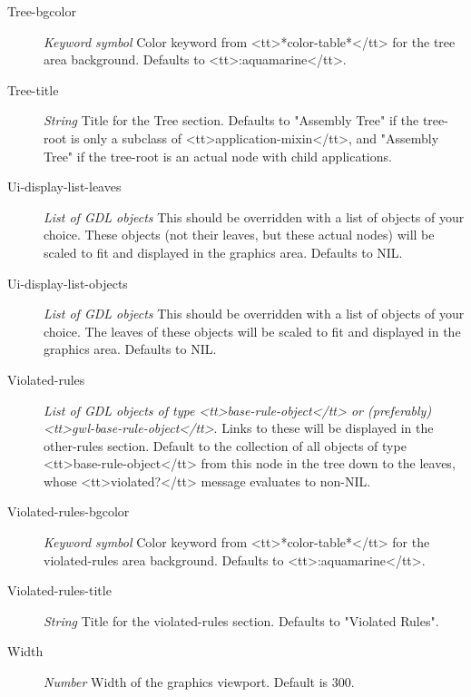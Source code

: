 \documentclass [11pt]{book}
\begin{document}
\begin{itemize}
\begin{description}
\item [Tree-bgcolor]
\emph{Keyword symbol} Color keyword from <tt>*color-table*</tt> for the tree area background. Defaults to <tt>:aquamarine</tt>.


\item [Tree-title]
\emph{String} Title for the Tree section. Defaults to "Assembly Tree" if the tree-root is only a
subclass of <tt>application-mixin</tt>, and "Assembly Tree" if the tree-root is an actual node with
child applications.


\item [Ui-display-list-leaves]
\emph{List of GDL objects} This should be overridden with a list of objects of your choice. These objects (not their leaves,
but these actual nodes) will be scaled to fit and displayed in the graphics area. Defaults to NIL.


\item [Ui-display-list-objects]
\emph{List of GDL objects} This should be overridden with a list of objects of your choice. The leaves of these objects will
be scaled to fit and displayed in the graphics area. Defaults to NIL.


\item [Violated-rules]
\emph{List of GDL objects of type <tt>base-rule-object</tt> or (preferably) <tt>gwl-base-rule-object</tt>}.
Links to these will be displayed in the other-rules section. Default to the collection of all objects of type
<tt>base-rule-object</tt> from this node in the tree down to the leaves, whose <tt>violated?</tt> message
evaluates to non-NIL.


\item [Violated-rules-bgcolor]
\emph{Keyword symbol} Color keyword from <tt>*color-table*</tt> for the violated-rules area background. Defaults to <tt>:aquamarine</tt>.


\item [Violated-rules-title]
\emph{String} Title for the violated-rules section. Defaults to "Violated Rules".


\item [Width]
\emph{Number} Width of the graphics viewport. Default is 300.


\end{description}







\end{itemize}
\end{document}
